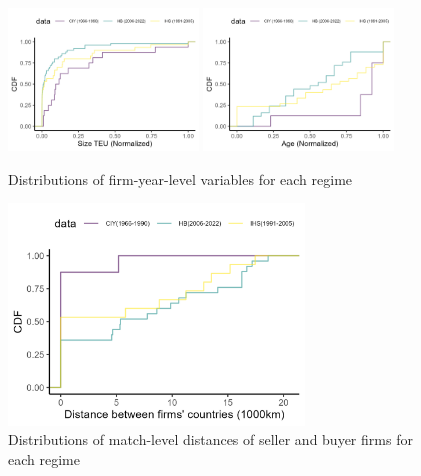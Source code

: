 \documentclass[10pt]{article}
\begin{document}
\begin{figure}[!ht]
\begin{center}
  \includegraphics[width = 0.45\textwidth]
  {figuretable/normalized_size_cdf.png}
  \includegraphics[width = 0.45\textwidth]
  {figuretable/normalized_age_cdf.png}
  \caption{Distributions of firm-year-level variables for each regime}
  \label{fg:size_cdf}
  \end{center}
\footnotesize
\end{figure}

\begin{figure}[!ht]
\begin{center}
  \includegraphics[width = 0.7\textwidth]
  {figuretable/distance_cdf.png}
  \caption{Distributions of match-level distances of seller and buyer firms for each regime}
  \label{fg:distance_cdf}
  \end{center}
\footnotesize
\end{figure}
\end{document}
